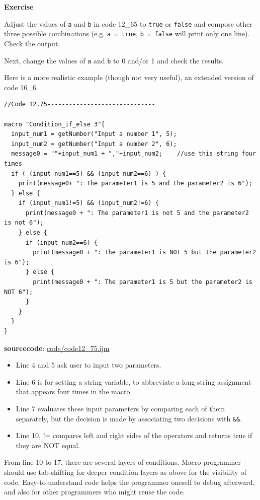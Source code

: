 \documentclass[11pt,a4paper,oneside]{report}
\newenvironment{indentexercise}[1]
{{\setlength{\leftmargin}{2em}}
\textbf{Exercise \thesubsection-#1}
\begin{list}{}
	\item
}
{\end{list}}
\newcommand{\ilcom}[1]{\texttt{\small#1}}
\begin{document}
\begin{indentexercise}{1}
Adjust the values of \ilcom{a} and \ilcom{b} in code 12\_65 to \ilcom{true} or \ilcom{false} and
compose other three possible combinations (e.g. \ilcom{a = true}, \ilcom{b = false} will print
only one line). Check the output.

Next, change the values of \ilcom{a} and \ilcom{b} to 0 and/or
1 and check the results. 
\end{indentexercise}

Here is a more realistic example (though not very useful), an extended version
of code 16\_6.

\begin{lstlisting}[morekeywords={*, if, else}]
//Code 12.75------------------------------

macro "Condition_if_else 3"{
  input_num1 = getNumber("Input a number 1", 5);
  input_num2 = getNumber("Input a number 2", 6);
  message0 = ""+input_num1 + ","+input_num2;	//use this string four times
  if ( (input_num1==5) && (input_num2==6) ) {
    print(message0+ ": The parameter1 is 5 and the parameter2 is 6");
  } else {
    if (input_num1!=5) && (input_num2!=6) {
      print(message0 + ": The parameter1 is not 5 and the parameter2 is not 6");
    } else {
      if (input_num2==6) {
        print(message0 + ": The parameter1 is NOT 5 but the parameter2 is 6");
      } else {
        print(message0 + ": The parameter1 is 5 but the parameter2 is NOT 6");
      }
    }
  }
}
\end{lstlisting}
\textbf{sourcecode}: \href{http://www.example.com/contents}{code/code12\_75.ijm}
\begin{itemize}
\item Line 4 and 5 ask user to input two parameters.
\item Line 6 is for setting a string variable, to abbreviate a long string assignment that appears four times in the macro.
\item Line 7 evaluates these input parameters by comparing each of them separately, but the decision is made by associating two decisions with \ilcom{\&\&}. 
\item Line 10, != compares left and right sides of the operators and returns true if they are NOT equal.   
\end{itemize}
From line 10 to 17, there are several layers of conditions. Macro programmer should use tab-shifting for deeper condition layers as above for the visibility of code. Easy-to-understand code helps the programmer oneself to debug afterward, and also for other programmers who might reuse the code.
 		
\end{document}
